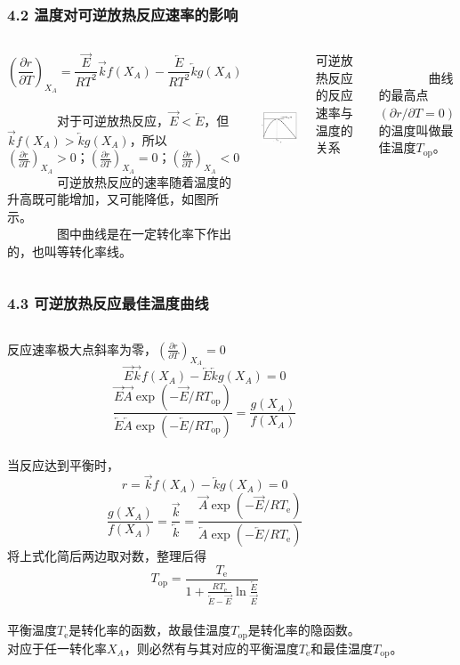 \begin{frame}
	\frametitle{4.2 温度对可逆放热反应速率的影响}
	\begin{columns}[c]
	\column{7cm}
		$$(\frac{\partial r}{\partial T} )_{X_A}=\frac{\overrightarrow{E}}{RT^2}\overrightarrow{k}f({X_A})-\frac{\overleftarrow{E}}{RT^2}\overleftarrow{k}g({X_A})$$
		\\~~~~~~~~对于可逆放热反应，$\overrightarrow{E}< \overleftarrow{E}$，但$\overrightarrow{k}f({X_A})> \overleftarrow{k}g({X_A})$，所以
		\\$(\frac{\partial r}{\partial T} )_{X_A}> 0$；$(\frac{\partial r}{\partial T} )_{X_A}= 0$；$(\frac{\partial r}{\partial T} )_{X_A}< 0$
		\\~~~~~~~~可逆放热反应的速率随着温度的升高既可能增加，又可能降低，如图所示。
		\\~~~~~~~~图中曲线是在一定转化率下作出的，也叫等转化率线。
			\column{7cm}
		\centerline{\includegraphics[height=4.5cm]{figs/fig2.3}}
		\centerline{\scriptsize{可逆放热反应的反应速率与温度的关系}}
		\\~~~~~~~~曲线的最高点$(\partial r/\partial T =0) $的温度叫做最佳温度$T_{\mathrm{op}}$。
	\end{columns}
\end{frame}


\begin{frame}
	\frametitle{4.3 可逆放热反应最佳温度曲线}
	\begin{columns}
		\column{7cm}
		反应速率极大点斜率为零，$(\frac{\partial r}{\partial T} )_{X_A}= 0$
		$$\overrightarrow{E}\overrightarrow{k}f({X_A})-\overleftarrow{E}\overleftarrow{k}g({X_A})=0$$
		$$\frac{\overrightarrow{E}\overrightarrow{A}\exp(-\overrightarrow{E}/RT_{\mathrm{op}})}{\overleftarrow{E}\overleftarrow{A}\exp(-\overleftarrow{E}/RT_{\mathrm{op}})}=\frac{g({X_A})}{f({X_A})}$$
		\\当反应达到平衡时，$$r=\overrightarrow{k}f(X_A)-\overleftarrow{k}g(X_A)=0$$
		$$\frac{g({X_A})}{f({X_A})}=\frac{\overrightarrow{k}}{\overleftarrow{k}}=\frac{\overrightarrow{A}\exp(-\overrightarrow{E}/RT_{\mathrm{e}})}{\overleftarrow{A}\exp(-\overleftarrow{E}/RT_{\mathrm{e}})}$$
				\column{7cm}
				将上式化简后两边取对数，整理后得				
		$$T_{\mathrm{op}}=\frac{T_{\mathrm{e}}}{1+\frac{RT_{\mathrm{e}}}{\overleftarrow{E}-\overrightarrow{E}}\ln\frac{\overleftarrow{E}}{\overrightarrow{E}}}$$
		\\平衡温度$T_{\mathrm{e}}$是转化率的函数，故最佳温度$T_{\mathrm{op}}$是转化率的隐函数。
		\\对应于任一转化率$X_A$，则必然有与其对应的平衡温度$T_{\mathrm{e}}$和最佳温度$T_{\mathrm{op}}$。
	\end{columns}
\end{frame}


